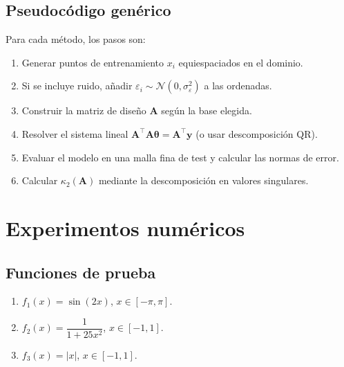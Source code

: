 \subsection{Pseudocódigo genérico}
Para cada método, los pasos son:
\begin{enumerate}
  \item Generar puntos de entrenamiento \(x_i\) equiespaciados en el dominio.
  \item Si se incluye ruido, añadir \(\varepsilon_i \sim \mathcal{N}(0,\sigma_\varepsilon^2)\) a las ordenadas.
  \item Construir la matriz de diseño \(\mathbf{A}\) según la base elegida.
  \item Resolver el sistema lineal \(\mathbf{A}^\top\mathbf{A} \boldsymbol{\theta} = \mathbf{A}^\top\mathbf{y}\) (o usar descomposición QR).
  \item Evaluar el modelo en una malla fina de test y calcular las normas de error.
  \item Calcular \(\kappa_2(\mathbf{A})\) mediante la descomposición en valores singulares.
\end{enumerate}

\section{Experimentos numéricos}

\subsection{Funciones de prueba}
\begin{enumerate}
  \item \(f_1(x) = \sin(2x)\), \(x\in[-\pi,\pi]\).
  \item \(f_2(x) = \dfrac{1}{1+25x^2}\), \(x\in[-1,1]\).
  \item \(f_3(x) = |x|\), \(x\in[-1,1]\).
\end{enumerate}

